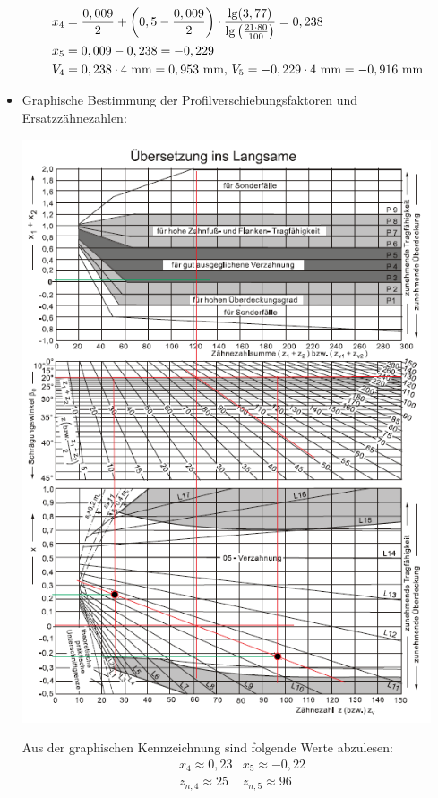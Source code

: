 \begin{itemize}
\begin{align*}
	&x_4 =\frac{0,009}{2} + \left( 0,5 - \frac{0,009}{2} \right) \cdot \frac{\lg(3,77)}{\lg\left( \frac{21 \cdot 80}{100} \right)} = 0,238 \\
	&x_5 = 0,009 - 0,238 = - 0,229 \\ 
	&V_4 = 0,238 \cdot 4 \text{ mm} = 0,953 \text{ mm, }V_5 = -0,229\cdot 4 \text{ mm} = -0,916 \text{ mm} 
\end{align*}
\newpage
\item Graphische Bestimmung der Profilverschiebungsfaktoren und Ersatzzähnezahlen:
\begin{center}
	\includegraphics[width=0.95\textwidth,keepaspectratio]{figures/Profilverschiebung45.png}
\end{center}
Aus der graphischen Kennzeichnung sind folgende Werte abzulesen:
\begin{align*}
	&x_4 \approx 0,23 &x_5 \approx -0,22 \\
	&z_{n,4} \approx 25 & z_{n,5} \approx 96	
\end{align*}

\end{itemize}
